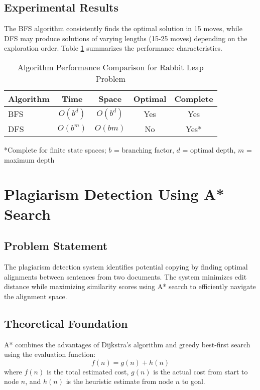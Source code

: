 \documentclass[conference]{IEEEtran}
\begin{document}
\subsection{Experimental Results}
The BFS algorithm consistently finds the optimal solution in 15 moves, while DFS may produce solutions of varying lengths (15-25 moves) depending on the exploration order. Table \ref{tab:rabbit_comparison} summarizes the performance characteristics.

\begin{table}[htbp]
\caption{Algorithm Performance Comparison for Rabbit Leap Problem}
\begin{center}
\begin{tabular}{|l|c|c|c|c|}
\hline
\textbf{Algorithm} & \textbf{Time} & \textbf{Space} & \textbf{Optimal} & \textbf{Complete} \\
\hline
BFS & $O(b^d)$ & $O(b^d)$ & Yes & Yes \\
DFS & $O(b^m)$ & $O(bm)$ & No & Yes* \\
\hline
\end{tabular}
\label{tab:rabbit_comparison}
\end{center}
*Complete for finite state spaces; $b$ = branching factor, $d$ = optimal depth, $m$ = maximum depth
\end{table}

\section{Plagiarism Detection Using A* Search}

\subsection{Problem Statement}
The plagiarism detection system identifies potential copying by finding optimal alignments between sentences from two documents. The system minimizes edit distance while maximizing similarity scores using A* search to efficiently navigate the alignment space.

\subsection{Theoretical Foundation}
A* combines the advantages of Dijkstra's algorithm and greedy best-first search using the evaluation function:
\begin{equation}
f(n) = g(n) + h(n)
\end{equation}
where $f(n)$ is the total estimated cost, $g(n)$ is the actual cost from start to node $n$, and $h(n)$ is the heuristic estimate from node $n$ to goal.
\end{document}
